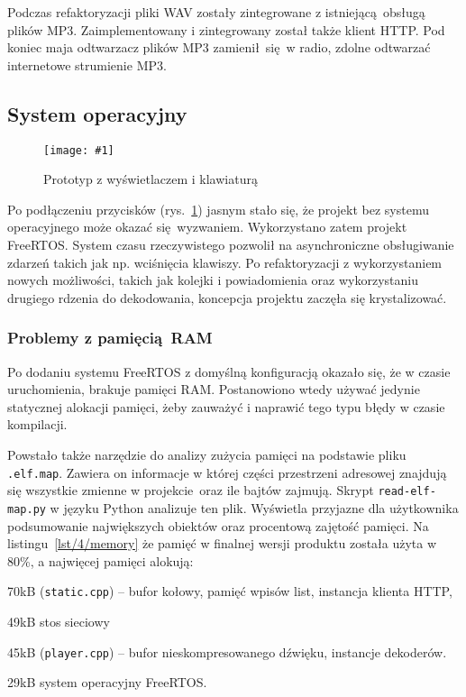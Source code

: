 \documentclass[polish]{aghengthesis}
\let\tempone\itemize
\let\temptwo\enditemize
\renewenvironment{itemize}{\tempone\setlength{\itemsep}{0cm}}{\temptwo}
\newcommand{\imgint}[4]{
	\begin{figure}[{#4}]
		\centering
		\texttt{[image: \#1]}
		\caption{#2}
		\label{#1}
	\end{figure}
}
\newcommand{\imgh}[3]{\imgint{#1}{#2}{#3}{H}}
\newcommand{\lstfile}[3]{
	\noindent
	\hspace{0.1\linewidth}
	\begin{minipage}{0.8\linewidth}
		
	\end{minipage}
	\vspace{0.3cm}
}
\begin{document}
			Podczas refaktoryzacji pliki WAV zostały zintegrowane z istniejącą obsługą plików MP3. Zaimplementowany i zintegrowany został także klient HTTP. Pod koniec maja odtwarzacz plików MP3 zamienił się w radio, zdolne odtwarzać internetowe strumienie MP3.
			
		\subsection{System operacyjny}
			\imgh{4/prototype_2}{Prototyp z wyświetlaczem i klawiaturą}{0.8}
		
			Po podłączeniu przycisków (rys.~\ref{4/prototype_2}) jasnym stało się, że projekt bez systemu operacyjnego może okazać się wyzwaniem. Wykorzystano zatem projekt FreeRTOS. System czasu rzeczywistego pozwolił na asynchroniczne obsługiwanie zdarzeń takich jak np. wciśnięcia klawiszy. Po refaktoryzacji z wykorzystaniem nowych możliwości, takich jak kolejki i powiadomienia oraz wykorzystaniu drugiego rdzenia do dekodowania, koncepcja projektu zaczęła się krystalizować.
			
			\subsubsection{Problemy z pamięcią RAM}
				Po dodaniu systemu FreeRTOS z domyślną konfiguracją okazało się, że w czasie uruchomienia, brakuje pamięci RAM.
				Postanowiono wtedy używać jedynie statycznej alokacji pamięci, żeby zauważyć i naprawić tego typu błędy w czasie kompilacji.

				\lstfile{default}{Zajętość pamięci RAM}{lst/4/memory}

				Powstało także narzędzie do analizy zużycia pamięci na podstawie pliku \lstinline|.elf.map|. Zawiera on informacje w której części przestrzeni adresowej znajdują się wszystkie zmienne w projekcie oraz ile bajtów zajmują. Skrypt \lstinline|read-elf-map.py| w języku Python analizuje ten plik. Wyświetla przyjazne dla użytkownika podsumowanie największych obiektów oraz procentową zajętość pamięci. Na listingu~\ref{lst/4/memory} że pamięć w finalnej wersji produktu została użyta w 80\%, a najwięcej pamięci alokują:
				\begin{itemize}
					\item 70kB (\lstinline|static.cpp|) -- bufor kołowy, pamięć wpisów list, instancja klienta HTTP,
					\item 49kB stos sieciowy
					\item 45kB (\lstinline|player.cpp|) -- bufor nieskompresowanego dźwięku, instancje dekoderów.
					\item 29kB system operacyjny FreeRTOS.
				\end{itemize}
			
\end{document}
